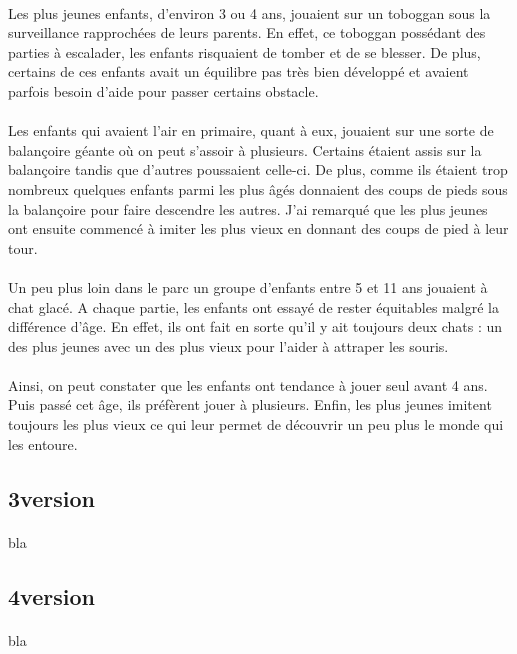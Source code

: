 \paragraph{}
Les plus jeunes enfants, d’environ 3 ou 4 ans, jouaient sur un toboggan sous la surveillance rapprochées de leurs parents. En effet, ce toboggan possédant des parties à escalader, les enfants risquaient de tomber et de se blesser. De plus, certains de ces enfants avait un équilibre pas très bien développé et avaient parfois besoin d’aide pour passer certains obstacle.
\paragraph{}
Les enfants qui avaient l’air en primaire, quant à eux, jouaient sur une sorte de balançoire géante où on peut s’assoir à plusieurs. Certains étaient assis sur la balançoire tandis que d’autres poussaient celle-ci. De plus, comme ils étaient trop nombreux quelques enfants parmi les plus âgés donnaient des coups de pieds sous la balançoire pour faire descendre les autres. J’ai remarqué que les plus jeunes ont ensuite commencé à imiter les plus vieux en donnant des coups de pied à leur tour. 
\paragraph{}
Un peu plus loin dans le parc un groupe d’enfants entre 5 et 11 ans jouaient à chat glacé. A chaque partie, les enfants ont essayé de rester équitables malgré la différence d’âge. En effet, ils ont fait en sorte qu’il y ait toujours deux chats : un des plus jeunes avec un des plus vieux pour l’aider à attraper les souris.
\paragraph{}
Ainsi, on peut constater que les enfants ont tendance à jouer seul avant 4 ans. Puis passé cet âge, ils préfèrent jouer à plusieurs. Enfin, les plus jeunes imitent toujours les plus vieux ce qui leur permet de découvrir un peu plus le monde qui les entoure. 

\subsection{3\ieme version}
\paragraph{}
bla

\subsection{4\ieme version}
\paragraph{}
bla
